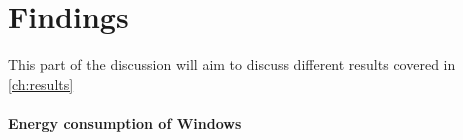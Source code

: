 \section{Findings}

This part of the discussion will aim to discuss different results covered in \cref{ch:results}

\paragraph*{Energy consumption of Windows}